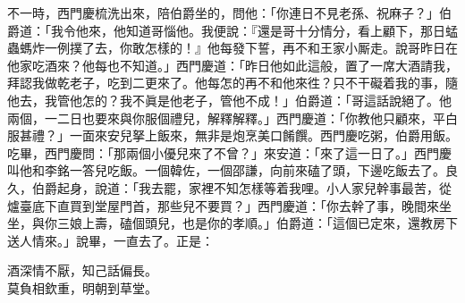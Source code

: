 不一時，西門慶梳洗出來，陪伯爵坐的，問他：「你連日不見老孫、祝麻子？」伯爵道：「我令他來，他知道哥惱他。我便說：『還是哥十分情分，看上顧下，那日蜢蟲螞炸一例撲了去，你敢怎樣的！』他每發下誓，再不和王家小厮走。說哥昨日在他家吃酒來？他每也不知道。」西門慶道：「昨日他如此這般，置了一席大酒請我，拜認我做乾老子，吃到二更來了。他每怎的再不和他來徃？只不干礙着我的事，隨他去，我管他怎的？我不眞是他老子，管他不成！」{}伯爵道：「哥這話說絕了。他兩個，一二日也要來與你服個禮兒，解釋解釋。」西門慶道：「你教他只顧來，平白服甚禮？」一面來安兒拏上飯來，無非是炮烹美口餚饌。西門慶吃粥，伯爵用飯。吃畢，西門慶問：「那兩個小優兒來了不曾？」來安道：「來了這一日了。」西門慶叫他和李銘一答兒吃飯。一個韓佐，一個邵謙，向前來磕了頭，下邊吃飯去了。良久，伯爵起身，說道：「我去罷，家裡不知怎樣等着我哩。小人家兒幹事最苦，從爐臺底下直買到堂屋門首，那些兒不要買？」西門慶道：「你去幹了事，晚間來坐坐，與你三娘上壽，磕個頭兒，也是你的孝順。」伯爵道：「這個已定來，還教房下送人情來。」說畢，一直去了。正是：

\begin{myquote}
酒深情不厭，知己話偏長。\\莫負相欽重，明朝到草堂。
\end{myquote}


